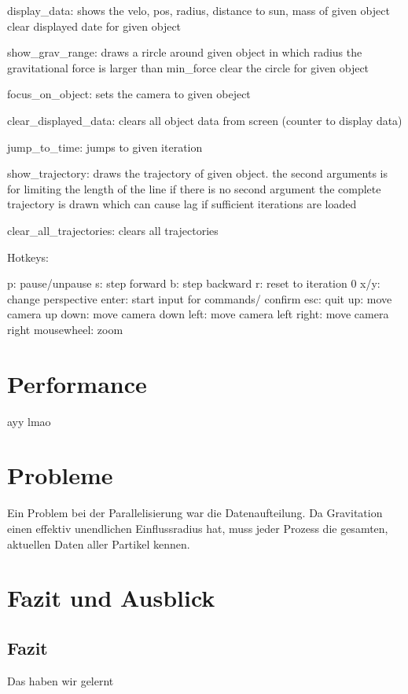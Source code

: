 display\_data:
    shows the velo, pos, radius, distance to sun, mass of given object
    clear displayed date for given object

show\_grav\_range:
    draws a rircle around given object in which radius the gravitational force is larger than min\_force
    clear the circle for given object

focus\_on\_object:
    sets the camera to given obeject

clear\_displayed\_data:
    clears all object data from screen (counter to display data)

jump\_to\_time:
    jumps to given iteration

show\_trajectory:
    draws the trajectory of given object.
    the second arguments is for limiting the length of the line
    if there is no second argument the complete trajectory is drawn which can cause lag if
    sufficient iterations are loaded

clear\_all\_trajectories:
    clears all trajectories

Hotkeys:

p:          pause/unpause
s:          step forward
b:          step backward
r:          reset to iteration 0
x/y:        change perspective
enter:      start input for commands/ confirm
esc:        quit
up:         move camera up
down:       move camera down
left:       move camera left
right:      move camera right
mousewheel: zoom


\section{Performance}
ayy lmao

\section{Probleme}
Ein Problem bei der Parallelisierung war die Datenaufteilung. Da Gravitation einen effektiv
unendlichen Einflussradius hat, muss jeder Prozess die gesamten, aktuellen Daten aller
Partikel kennen.

\section{Fazit und Ausblick}
\subsection{Fazit}
Das haben wir gelernt
